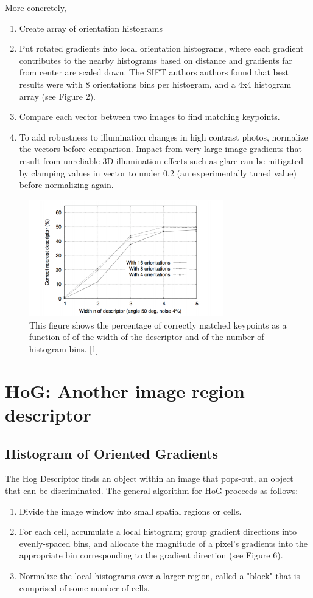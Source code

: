 \documentclass{article}
\begin{document}
More concretely,
\begin{enumerate}
  \item Create array of orientation histograms
  \item Put rotated gradients into local orientation histograms, where each gradient contributes to the nearby histograms based on distance and gradients far from center are scaled down. The SIFT authors authors	found that best results	were with 8 orientations bins per histogram, and a 4x4 histogram array (see Figure 2).
  \item Compare each vector between two images to find matching keypoints.
  \item To add robustness to illumination changes in high contrast photos, normalize the vectors before comparison. Impact from very large image gradients that result from unreliable 3D illumination effects such as glare can be mitigated by clamping values in vector to under 0.2 (an experimentally tuned value) before normalizing again. 
\end{enumerate}

\begin{figure}[h]
  \centering
  \includegraphics[width=0.75\textwidth]{histogramsensitivity}
  \caption{This figure shows the percentage of correctly matched keypoints as a function of of the width of the descriptor and of the number of histogram bins. [1]}
\end{figure}


\section{HoG: Another image region descriptor}
\subsection{Histogram of Oriented Gradients}
The Hog Descriptor finds an object within an image that pops-out, an object that can be discriminated. The general algorithm for HoG proceeds as follows:
\begin{enumerate}
	\item Divide the image window into small spatial regions or cells. 
    \item For each cell, accumulate a local histogram; group gradient directions into evenly-spaced bins, and allocate the magnitude of a pixel's gradients into the appropriate bin corresponding to the gradient direction  (see Figure 6). 
    \item Normalize the local histograms over a larger region, called a "block" that is comprised of some number of cells.
\end{enumerate}
\end{document}
